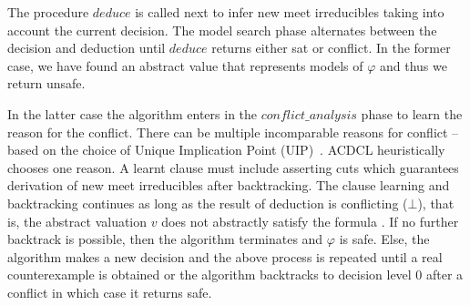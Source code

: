 The procedure $\mathit{deduce}$ is called next to infer new meet
irreducibles taking into account the current decision.  The model search phase
alternates between the decision and deduction until $\mathit{deduce}$
returns either \textsf{sat} or \textsf{conflict}.
In the former case, we have found an abstract value that represents 
models of $\varphi$ and thus we return \textsf{unsafe}.
%

In the latter case the algorithm enters in the
$\mathit{conflict\_analysis}$ phase to learn the reason for the
conflict.  There can be multiple incomparable reasons for conflict --
based on the choice of Unique Implication Point (UIP)~\cite{cdcl}.
ACDCL heuristically chooses one reason.  A learnt clause must include
asserting cuts which guarantees derivation of new meet irreducibles
after backtracking. The clause learning and backtracking continues as
long as the result of deduction is conflicting ($\bot$), that is, the
abstract valuation $v$ does not abstractly satisfy the formula
.  If no further backtrack is possible, then the
algorithm terminates and $\varphi$ is \textsf{safe}. Else, the
algorithm makes a new decision and the above process is repeated until
a real counterexample  is obtained or the
algorithm backtracks to decision level 0 after a conflict in which
case it returns \textsf{safe}.

